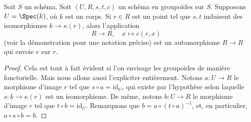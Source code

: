 \begin{lemma}
\label{lemma-groupoid-on-field-move-point}
Soit $S$ un schéma. Soit $(U, R, s, t, c)$ un schéma en groupoïdes
sur $S$. Supposons $U = \Spec(k)$, où $k$ est un corps.
Si $r \in R$ est un point tel que $s, t$ induisent des
isomorphismes $k \to \kappa(r)$, alors l'application
$$
R \longrightarrow R, \quad
x \longmapsto c(r, x)
$$
(voir la démonstration pour une notation précise) est un automorphisme $R \to R$
qui envoie $e$ sur $r$.
\end{lemma}

\begin{proof}
Cela est tout à fait évident si l'on envisage les groupoïdes de manière
fonctorielle. Mais nous allons aussi l'expliciter entièrement.
Notons $a : U \to R$ le morphisme d'image $r$ tel que
$s \circ a = \text{id}_U$, qui existe par l'hypothèse
selon laquelle $s : k \to \kappa(r)$ est un isomorphisme. De même, notons
$b : U \to R$ le morphisme d'image $r$ tel que
$t \circ b = \text{id}_U$. Remarquons que
$b = a \circ (t \circ a)^{-1}$, et, en particulier,
$a \circ s \circ b = b$.


\end{proof}
